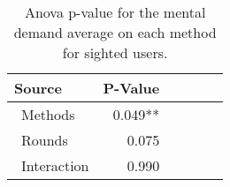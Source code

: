 
\begin{table}[!htb]
\centering
\caption{Anova p-value for the mental demand average on each method for sighted users.}
\label{tab:blocanova_md_avg_two_way_sight}
\begin{tabular}{lrrrrl}
\toprule
          Source & P-Value \\
\midrule
    \    Methods & 0.049** \\
     \    Rounds &   0.075 \\
\    Interaction &   0.990 \\
\bottomrule
\end{tabular}
\end{table}

